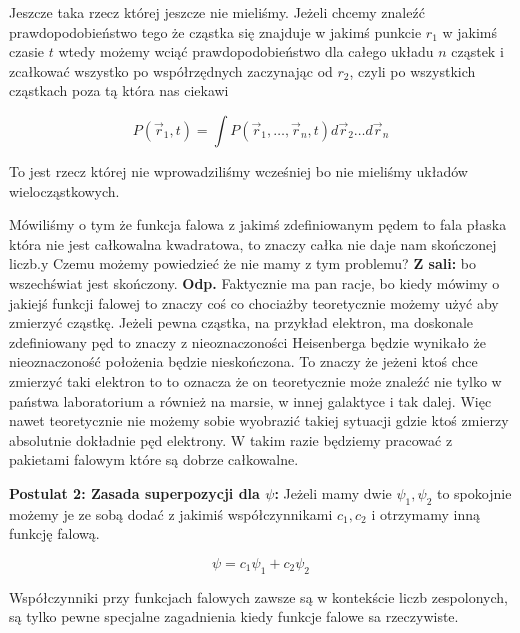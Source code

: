 Jeszcze taka rzecz której jeszcze nie mieliśmy. Jeżeli chcemy znaleźć prawdopodobieństwo tego że cząstka się znajduje w jakimś punkcie $r_1$ w jakimś czasie $t$ wtedy możemy wciąć prawdopodobieństwo dla całego układu $n$ cząstek i zcałkować wszystko po współrzędnych zaczynając od $r_2$, czyli po wszystkich cząstkach poza tą która nas ciekawi

\begin{equation*}
	P(\vec{r}_1, t) = \int P (\vec{r}_1, \dots, \vec{r}_n, t) d\vec{r}_2\dots d\vec{r}_n
\end{equation*}

To jest rzecz której nie wprowadziliśmy wcześniej bo nie mieliśmy układów wielocząstkowych.

Mówiliśmy o tym że funkcja falowa z jakimś zdefiniowanym pędem to fala płaska która nie jest całkowalna kwadratowa, to znaczy całka nie daje nam skończonej liczb.y Czemu możemy powiedzieć że nie mamy z tym problemu? \textbf{Z sali:} bo wszechświat jest skończony. \textbf{Odp.} Faktycznie ma pan racje, bo kiedy mówimy o jakiejś funkcji falowej to znaczy coś co chociażby teoretycznie możemy użyć aby zmierzyć cząstkę. Jeżeli pewna cząstka, na przykład elektron, ma doskonale zdefiniowany pęd to znaczy z nieoznaczoności Heisenberga będzie wynikało że nieoznaczoność położenia będzie nieskończona. To znaczy że jeżeni ktoś chce zmierzyć taki elektron to to oznacza że on teoretycznie może znaleźć nie tylko w państwa laboratorium a również na marsie, w innej galaktyce i tak dalej. Więc nawet teoretycznie nie możemy sobie wyobrazić takiej sytuacji gdzie ktoś zmierzy absolutnie dokładnie pęd elektrony. W takim razie będziemy pracować z pakietami falowym które są dobrze całkowalne.

\textbf{Postulat 2: Zasada superpozycji dla $\psi$:} Jeżeli mamy dwie $\psi_1, \psi_2$ to spokojnie możemy je ze sobą dodać z jakimiś współczynnikami $c_1, c_2$ i otrzymamy inną funkcję falową. 

\begin{equation*}
	\psi = c_1 \psi_1 + c_2 \psi_2
\end{equation*}

Współczynniki przy funkcjach falowych zawsze są w kontekście liczb zespolonych, są tylko pewne specjalne zagadnienia kiedy funkcje falowe sa rzeczywiste.

